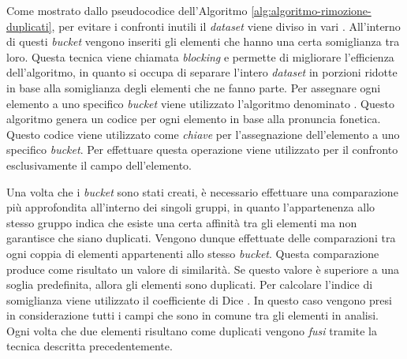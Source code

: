 Come mostrato dallo pseudocodice dell'Algoritmo \ref{alg:algoritmo-rimozione-duplicati}, per evitare i confronti inutili il \emph{dataset} viene diviso in vari . All'interno di questi \emph{bucket} vengono inseriti gli elementi che hanno una certa somiglianza tra loro. Questa tecnica viene chiamata \emph{blocking} \cite{elmagarmid2007duplicate} e permette di migliorare l'efficienza dell'algoritmo, in quanto si occupa di separare l'intero \emph{dataset} in porzioni ridotte in base alla somiglianza degli elementi che ne fanno parte. Per assegnare ogni elemento a uno specifico \emph{bucket} viene utilizzato l'algoritmo denominato  \cite{odell1918soundex}. Questo algoritmo genera un codice per ogni elemento in base alla pronuncia fonetica. Questo codice viene utilizzato come \emph{chiave} per l'assegnazione dell'elemento a uno specifico \emph{bucket}. Per effettuare questa operazione viene utilizzato per il confronto esclusivamente il campo  dell'elemento.

Una volta che i \emph{bucket} sono stati creati, è necessario effettuare una comparazione più approfondita all'interno dei singoli gruppi, in quanto l'appartenenza allo stesso gruppo indica che esiste una certa affinità tra gli elementi ma non garantisce che siano duplicati. Vengono dunque effettuate delle comparazioni tra ogni coppia di elementi appartenenti allo stesso \emph{bucket}. Questa comparazione produce come risultato un valore di similarità. Se questo valore è superiore a una soglia predefinita, allora gli elementi sono duplicati. Per calcolare l'indice di somiglianza viene utilizzato il coefficiente di Dice \cite{dice1945measures}. In questo caso vengono presi in considerazione tutti i campi che sono in comune tra gli elementi in analisi. Ogni volta che due elementi risultano come duplicati vengono \emph{fusi} tramite la tecnica descritta precedentemente.

